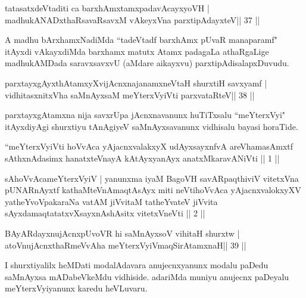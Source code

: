 \begin{shl}
tatasatxdeVtaditi ca barxhAmxtamxpadavAcayxyoVH |
madhukANADxthaRsavaRsavxM vAkeyxVna parxtipAdayxteV\hfill || 37 ||
\end{shl}

\begin{artha}
A madhu bArxhamxNadiMda ``tadeVtadf barxhAmx pUvaR manaparamf" itAyxdi vAkayxdiMda barxhamx matutx Atamx padagaLa athaRgaLige madhukAMDada saravxsavxvU (aMdare aikayxvu) parxtipAdisalapxDuvudu.
\end{artha}


\begin{shl}
parxtayxgAyxthAtamxyXvijAcnxnajanamxneV\s taH shurxtiH savxyamf |
vidhitasxnitxVha saMnAyxsaM meYterxVyiVti parxvataRteV\hfill || 38 ||
\end{shl}

\begin{artha}
parxtayxgAtamxna nija savxrUpa jAcnxnavanunx huTiTxsalu ``meYterxVyi" itAyxdiyAgi shurxtiyu tAnAgiyeV saMnAyxsavanunx vidhisalu bayasi horaTide.
\end{artha}


\begin{kandikeshl}
``meYterxVyiVti hoVvAca yAjacnxvalakxyX udAyxsayxnfvA 
areV\s hamasAmxtf sAthxnAdasimx hanatxteV\s nayA
kAtAyxyanAyx anatxMkaravANiVti || 1 ||

sAhoVvAcameYterxVyiV | yanunxma iyaM BagoVH
savARpaqthiviV vitetxVna pUNARnAyxtf kathaMteVnA\s maqtAsAyx
miti neVtihoVvAca yAjacnxvalokxyXV yatheYvoVpakaraNa
vatAM jiVvitaM tatheYvateV jiVvita sAyxdamaqtatatxvXsayxnAshAsitx
vitetxVneVti || 2 ||
\end{kandikeshl}


\begin{shl}
BAyARdayxnujAcnxpUvoVR hi saMnAyxsoV vihitaH shurxtw |
atoV\s nujAcnxthaRmeVvA\s\s ha meYterxVyiVmaqSirAtamxnaH\hfill || 39 ||
\end{shl}

\begin{artha}
I shurxtiyalilx heMDati modalAdavara anujecnxyanunx modalu paDedu saMnAyxsa mADabeVkeMdu vidhiside. adariMda muniyu anujecnx paDeyalu meYterxVyiyanunx karedu heVLuvaru.
\end{artha}

